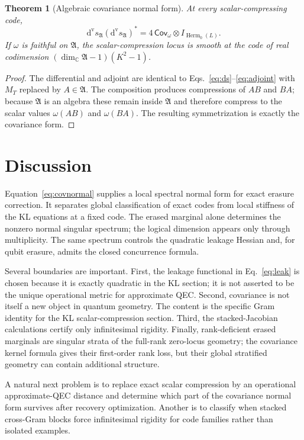 \documentclass[11pt]{article}
\newtheorem{theorem}{Theorem}[section]
\theoremstyle{definition}
\newcommand{\Herm}{\operatorname{Herm}}
\newcommand{\C}{\mathbb C}
\newcommand{\dvs}{\mathrm d^{\mathrm v}\!s}
\begin{document}
\begin{theorem}[Algebraic covariance normal form]
At every scalar-compressing code,
\begin{equation}
\boxed{\dvs_{\mathfrak A}(\dvs_{\mathfrak A})^*=4\,\mathsf{Cov}_\omega\otimes I_{\Herm_0(L)}.}
\end{equation}
If $\omega$ is faithful on $\mathfrak A$, the scalar-compression locus is smooth at the code of real codimension $(\dim_{\C}\mathfrak A-1)(K^2-1)$.
\end{theorem}
\begin{proof}
The differential and adjoint are identical to Eqs.~\eqref{eq:ds}--\eqref{eq:adjoint} with $M_T$ replaced by $A\in\mathfrak A$. The composition produces compressions of $AB$ and $BA$; because $\mathfrak A$ is an algebra these remain inside $\mathfrak A$ and therefore compress to the scalar values $\omega(AB)$ and $\omega(BA)$. The resulting symmetrization is exactly the covariance form.
\end{proof}

\section{Discussion}
Equation~\eqref{eq:covnormal} supplies a local spectral normal form for exact erasure correction. It separates global classification of exact codes from local stiffness of the KL equations at a fixed code. The erased marginal alone determines the nonzero normal singular spectrum; the logical dimension appears only through multiplicity. The same spectrum controls the quadratic leakage Hessian and, for qubit erasure, admits the closed concurrence formula.

Several boundaries are important. First, the leakage functional in Eq.~\eqref{eq:leak} is chosen because it is exactly quadratic in the KL section; it is not asserted to be the unique operational metric for approximate QEC. Second, covariance is not itself a new object in quantum geometry. The content is the specific Gram identity for the KL scalar-compression section. Third, the stacked-Jacobian calculations certify only infinitesimal rigidity. Finally, rank-deficient erased marginals are singular strata of the full-rank zero-locus geometry; the covariance kernel formula gives their first-order rank loss, but their global stratified geometry can contain additional structure.

A natural next problem is to replace exact scalar compression by an operational approximate-QEC distance and determine which part of the covariance normal form survives after recovery optimization. Another is to classify when stacked cross-Gram blocks force infinitesimal rigidity for code families rather than isolated examples.
\end{document}
